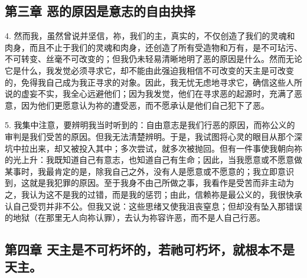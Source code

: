 
\subsection{第三章 恶的原因是意志的自由抉择}

4. 然而我，虽然曾说并坚信，祢，我们的主，真实的，不仅创造了我们的灵魂和肉身，而且不止于我们的灵魂和肉身，还创造了所有受造物和万有，是不可玷污、不可转变、丝毫不可改变的；但我仍未轻易清晰地明了恶的原因是什么。然而无论它是什么，我发觉必须寻求它，却不能由此强迫我相信不可改变的天主是可改变的，免得我自己成为我正寻求的对象。因此，我无忧无虑地寻求它，确信这些人所说的虚妄不实，我全心远避他们；因为我发觉，他们在寻求恶的起源时，充满了恶意，因为他们更愿意认为祢的遭受恶，而不愿承认是他们自己犯下了恶。\par

5. 我集中注意，要辨明我当时听到的：自由意志是我们行恶的原因，而祢公义的审判是我们受苦的原因。但我无法清楚辨明。于是，我试图将心灵的眼目从那个深坑中拉出来，却又被投入其中；多次尝试，就多次被抛回。但有一件事使我朝向祢的光上升：我既知道自己有意志，也知道自己有生命；因此，当我愿意或不愿意做某事时，我最肯定的是，除我自己之外，没有人是愿意或不愿意的；我立即意识到，这就是我犯罪的原因。至于我身不由己所做之事，我看作是受苦而非主动为之，我认为这不是我的过错，而是我的惩罚；由此，信赖祢是最公义的，我很快承认自己受罚并非不公。但我又说：这些思绪又使我沮丧窒息；但却没有坠入那错误的地狱（在那里无人向祢认罪），去认为祢容许恶，而不是人自己行恶。\par


\subsection{第四章 天主是不可朽坏的，若祂可朽坏，就根本不是天主。}

